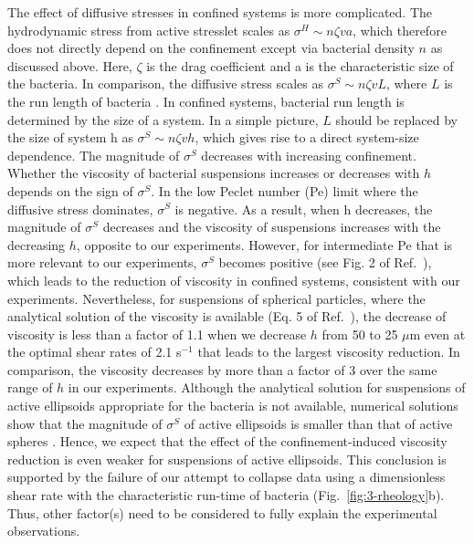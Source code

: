 The effect of diffusive stresses in confined systems is more complicated. The hydrodynamic stress from active stresslet scales as $\sigma^H \sim n\zeta v a$, which therefore does not directly depend on the confinement except via bacterial density $n$ as discussed
above. Here, $\zeta$ is the drag coefficient and a is the characteristic size of the bacteria. In comparison, the diffusive stress scales as $\sigma^S \sim n \zeta v L$, where $L$ is the run length of bacteria \cite{Takatori2017}. In confined systems, bacterial run length is determined by the size of a system. In a simple picture, $L$ should be replaced by the size of system h as $\sigma^S \sim n \zeta v h$, which gives rise to a direct system-size dependence. The magnitude of $\sigma^S$ decreases with increasing confinement. Whether the viscosity of bacterial suspensions increases or decreases with $h$ depends on the sign of $\sigma^S$. In the low Peclet number (Pe) limit where the diffusive stress dominates, $\sigma^S$ is negative. As a result, when h decreases, the magnitude of $\sigma^S$ decreases and the viscosity of suspensions increases with the decreasing $h$, opposite to our experiments.
However, for intermediate Pe that is more relevant to our experiments, $\sigma^S$ becomes positive (see Fig. 2 of Ref.~\cite{Takatori2017}), which leads to the reduction of viscosity in confined systems, consistent with our experiments. Nevertheless, for suspensions of spherical particles, where the analytical solution of the viscosity is available (Eq. 5 of Ref.~\cite{Takatori2017}), the decrease of viscosity is less than a factor of 1.1 when we decrease $h$ from 50 to 25 $\mu$m even at the optimal shear rates of 2.1 s$^{-1}$ that leads to the largest viscosity reduction. In comparison, the viscosity decreases by more than a factor of 3 over the same range of $h$ in our experiments. Although the analytical solution for suspensions of active ellipsoids appropriate for the bacteria is not available, numerical solutions show that the magnitude of $\sigma^S$ of active ellipsoids is smaller than that of active spheres \cite{Takatori2017}. Hence, we expect that the effect of the confinement-induced viscosity reduction is even weaker for suspensions of active ellipsoids.
This conclusion is supported by the failure of our attempt to collapse data using a dimensionless shear rate with the characteristic run-time of bacteria (Fig.~\ref{fig:3-rheology}b). Thus, other factor(s) need to be considered to fully explain the experimental observations.

